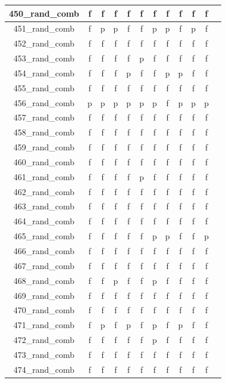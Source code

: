 \documentclass[
fancyheadings, %
%
%
]{stsreprt}
\begin{document}
\begin{longtable}{|c|c|c|c|c|c|c|c|c|c|c|c|}
450\_rand\_comb  & f & f & f & f & f & f & f & f & f & f \\
\hline
451\_rand\_comb & f & p & p & f & f & p & p & f & p & f \\
\hline
452\_rand\_comb  & f & f & f & f & f & f & f & f & f & f \\
\hline
453\_rand\_comb & f & f & f & f & p & f & f & f & f & f \\
\hline
454\_rand\_comb & f & f & f & p & f & f & p & p & f & f \\
\hline
455\_rand\_comb  & f & f & f & f & f & f & f & f & f & f \\
\hline
456\_rand\_comb & p & p & p & p & p & p & f & p & p & p \\
\hline
457\_rand\_comb  & f & f & f & f & f & f & f & f & f & f \\
\hline
458\_rand\_comb  & f & f & f & f & f & f & f & f & f & f \\
\hline
459\_rand\_comb  & f & f & f & f & f & f & f & f & f & f \\
\hline
460\_rand\_comb  & f & f & f & f & f & f & f & f & f & f \\
\hline
461\_rand\_comb & f & f & f & f & p & f & f & f & f & f \\
\hline
462\_rand\_comb  & f & f & f & f & f & f & f & f & f & f \\
\hline
463\_rand\_comb  & f & f & f & f & f & f & f & f & f & f \\
\hline
464\_rand\_comb  & f & f & f & f & f & f & f & f & f & f \\
\hline
465\_rand\_comb & f & f & f & f & f & p & p & f & f & p \\
\hline
466\_rand\_comb  & f & f & f & f & f & f & f & f & f & f \\
\hline
467\_rand\_comb  & f & f & f & f & f & f & f & f & f & f \\
\hline
468\_rand\_comb & f & f & p & f & f & p & f & f & f & f \\
\hline
469\_rand\_comb  & f & f & f & f & f & f & f & f & f & f \\
\hline
470\_rand\_comb  & f & f & f & f & f & f & f & f & f & f \\
\hline
471\_rand\_comb & f & p & f & p & f & p & f & p & f & f \\
\hline
472\_rand\_comb & f & f & f & f & f & p & f & f & f & f \\
\hline
473\_rand\_comb  & f & f & f & f & f & f & f & f & f & f \\
\hline
474\_rand\_comb  & f & f & f & f & f & f & f & f & f & f \\

\end{longtable}
\end{document}
